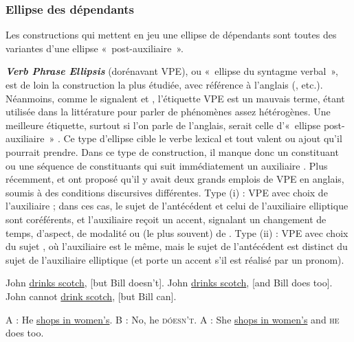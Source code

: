 \subsubsection{Ellipse des dépendants} \label{ch1:sect1.4.1.2}

Les constructions qui mettent en jeu une ellipse de dépendants sont toutes des variantes d’une ellipse «~post-auxiliaire~».

\textbf{\textit{Verb Phrase Ellipsis}} (dorénavant VPE), ou «~ellipse du syntagme verbal~», est de loin la construction la plus étudiée, avec référence à l’anglais (\citealt{Sag1976,Hardt1993,Johnson2001,Dalrymple2005}, etc.). Néanmoins, comme le signalent \citet{Miller2011} et \citet{MillerEtAl2014a}, l’étiquette VPE est un mauvais terme, étant utilisée dans la littérature pour parler de phénomènes assez hétérogènes. Une meilleure étiquette, surtout si l’on parle de l’anglais, serait celle d’«~ellipse post-auxiliaire~» \citep{Miller2011,Miller2014b}. Ce type d’ellipse cible le verbe lexical et tout valent ou ajout qu’il pourrait prendre. Dans ce type de construction, il manque donc un constituant ou une séquence de constituants qui suit immédiatement un auxiliaire . Plus récemment, \citet{Miller2011,Miller2014b} et \citet{MillerEtAl2014a} ont proposé qu’il y avait deux grands emplois de VPE en anglais, soumis à des conditions discursives différentes. Type (i) : VPE avec choix de l’auxiliaire  ; dans ces cas, le sujet de l’antécédent et celui de l’auxiliaire elliptique sont coréférents, et l’auxiliaire reçoit un accent, signalant un changement de temps, d’aspect, de modalité ou (le plus souvent) de . Type (ii) : VPE avec choix du sujet , où l’auxiliaire est le même, mais le sujet de l’antécédent est distinct du sujet de l’auxiliaire elliptique (et porte un accent s’il est réalisé par un pronom). 

\ea \label{ch1:ex58}
\ea  John \uline{drinks scotch}, [but Bill doesn’t].
\ex  John \uline{drinks scotch}, [and Bill does too].
\ex  John cannot \uline{drink scotch}, [but Bill can].
\z
\z

\ea
\ea  A : He \uline{shops in women’s}.    B : No, he \textsc{dóesn’t}. \label{ch1:ex59a}   
\ex  A : She \uline{shops in women’s} and \textsc{he} does too. \label{ch1:ex59b} \z
\z

